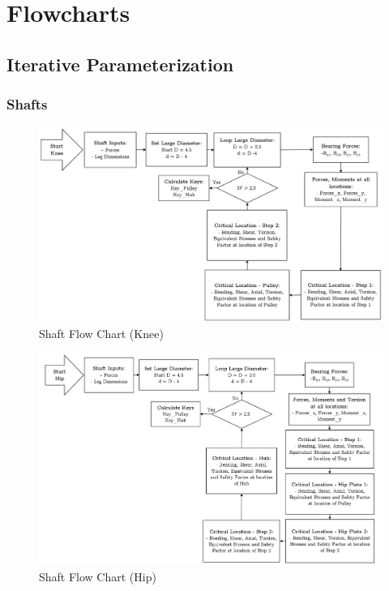\section{Flowcharts} \label{app_sec:flowcharts}

\subsection{Iterative Parameterization}

\subsubsection{Shafts} \label{app_subsec:shaft_flowchart}

\begin{figure}[H]
    \centering
    \includegraphics[width=\textwidth]{6_Appendices/Flowcharts/shaftFlowChart_Knee.png}
    \caption{Shaft Flow Chart (Knee)}
    \label{fig:shaft_flowchart(knee)}
\end{figure}{}

\begin{figure}[H]
    \centering
    \includegraphics[width=\textwidth]{6_Appendices/Flowcharts/ShaftFlowChart_Hip.png}
    \caption{Shaft Flow Chart (Hip)}
    \label{fig:shaft_flowchart(hip)}
\end{figure}{}

